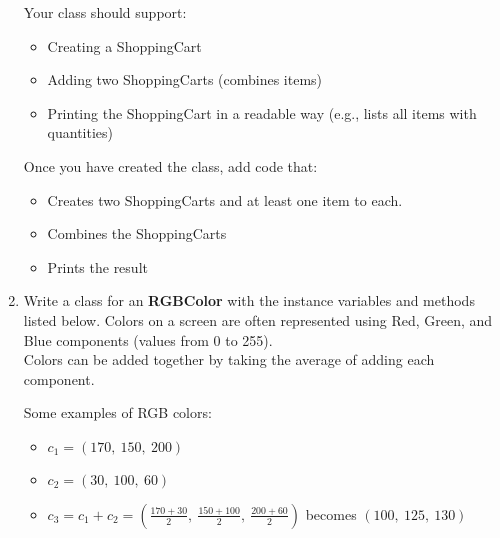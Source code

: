 \documentclass{article}
\begin{document}
\begin{enumerate}
		Your class should support:
		\begin{itemize}
			\item Creating a ShoppingCart
			\item Adding two ShoppingCarts (combines items)
			\item Printing the ShoppingCart in a readable way 
				(e.g., lists all items with quantities)
		\end{itemize}
		
		Once you have created the class, add code that:
		\begin{itemize}
			\item Creates two ShoppingCarts and at least one item to each.
			\item Combines the ShoppingCarts
			\item Prints the result
		\end{itemize}




	\item
		Write a class for an \textbf{RGBColor} with the instance variables and methods listed 
		below. Colors on a screen are often represented using Red, Green, and Blue components 
		(values from 0 to 255).\\
		Colors can be added together by taking the average of adding each component.

		\begin{minipage}[t]{0.7\textwidth}
			Some examples of RGB colors:
			\begin{itemize}
				\item $c_1 = (170,\ 150,\ 200)$
				\item $c_2 = (30,\ 100,\ 60)$
				\item $c_3 = c_1 + c_2 = (\frac{170+30}{2},\ \frac{150+100}{2},\ \frac{200+60}{2})$ 
					becomes $(100,\ 125,\ 130)$
			\end{itemize}
		

\end{minipage}
\end{enumerate}
\end{document}
